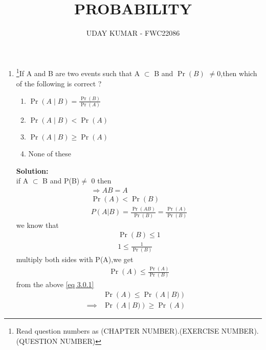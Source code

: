 \documentclass{article}
\providecommand{\pr}[1]{\ensuremath{\Pr\left(#1\right)}}
\newcommand{\solution}{\noindent \textbf{Solution: }}
\begin{document}
\title{PROBABILITY}
\author{\Large UDAY KUMAR - FWC22086}
\date{}

\maketitle

\begin{enumerate}[label=13.\arabic{enumi}.\arabic{enumii}]%
\setcounter{enumi}{3}
\setcounter{enumii}{14}

\item \footnote{Read question numbers as (CHAPTER NUMBER).(EXERCISE NUMBER).(QUESTION NUMBER)}{If A and B are two events such that A $\subset$ B and \pr{B} $\neq$0,then which of the following is correct ?}
\begin{enumerate}
\item $\pr{A \mid B} = \frac{\pr{B}}{\pr{A}}$ 
\item $\pr{A \mid B} < \pr{A}$
\item $\pr{A \mid B} \geq \pr{A}$  
\item None of these
\end{enumerate}
	\solution\\
		if A $\subset$ B and P(B)$\neq$ 0 then \\
\begin{align}
&\Rightarrow AB =A&\\
&\pr{A} < \pr{B}&\\
&P(A|B) = \frac{\pr{A B}}{\pr{B}}=\frac{\pr{A}}{\pr{B}}&\label{eq 3.0.1}
\end{align}
we know that 
\begin{align}
&\pr{B} \leq 1&\\
&1 \leq \frac{1}{\pr{B}}&
\end{align}
multiply both sides with P(A),we get 
\begin{align}
&\pr{A} \leq \frac{\pr{A}}{\pr{B}}&
\end{align}
from the above \eqref{eq 3.0.1}
\begin{align}
&\pr{A} \leq \pr{A \mid B)}&\\
\implies &\pr{A \mid B)} \geq \pr{A}&
\end{align}
\end{enumerate}
\end{document}
